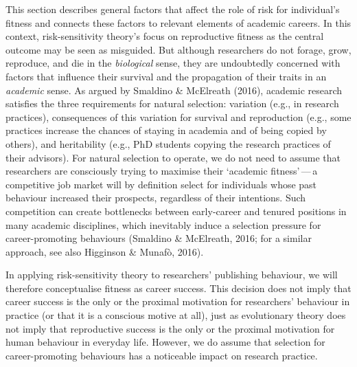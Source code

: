 \documentclass[
  ,man,mask,floatsintext]{apa6}
\begin{document}
This section describes general factors that affect the role of risk for individual's fitness and connects these factors to relevant elements of academic careers.
In this context, risk-sensitivity theory's focus on reproductive fitness as the central outcome may be seen as misguided.
But although researchers do not forage, grow, reproduce, and die in the \emph{biological} sense,
they are undoubtedly concerned with factors that influence
their survival and the propagation of their traits in an \emph{academic} sense.
As argued by Smaldino \& McElreath (2016), academic research satisfies the three requirements for natural selection:
variation (e.g., in research practices), consequences of this variation for survival and reproduction (e.g., some practices increase the chances of staying in academia and of being copied by others), and heritability (e.g., PhD students copying the research practices of their advisors).
For natural selection to operate,
we do not need to assume that researchers are consciously trying to maximise their `academic fitness'\(\,\)---\(\,\)a competitive job market will by definition select for individuals whose past behaviour increased their prospects, regardless of their intentions.
Such competition can create bottlenecks between early-career and tenured positions in many academic disciplines, which inevitably induce a selection pressure for career-promoting behaviours (Smaldino \& McElreath, 2016; for a similar approach, see also Higginson \& Munafò, 2016).

In applying risk-sensitivity theory to researchers' publishing behaviour, we will therefore conceptualise fitness as career success.
This decision does not imply that career success is the only or the proximal motivation for researchers' behaviour in practice (or that it is a conscious motive at all), just as evolutionary theory does not imply that reproductive success is the only or the proximal motivation for human behaviour in everyday life.
However, we do assume that selection for career-promoting behaviours has a noticeable impact on research practice.
\end{document}
